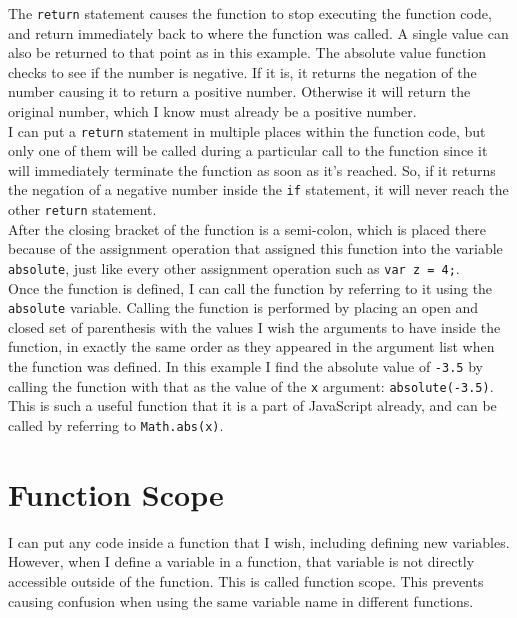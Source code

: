 The \texttt{return} statement causes the function to stop executing the function code, and return immediately back to where the function was called. A single value can also be returned to that point as in this example. The absolute value function checks to see if the number is negative. If it is, it returns the negation of the number causing it to return a positive number. Otherwise it will return the original number, which I know must already be a positive number.\\

I can put a \texttt{return} statement in multiple places within the function code, but only one of them will be called during a particular call to the function since it will immediately terminate the function as soon as it's reached. So, if it returns the negation of a negative number inside the \texttt{if} statement, it will never reach the other \texttt{return} statement.\\

After the closing bracket of the function is a semi-colon, which is placed there because of the assignment operation that assigned this function into the variable \texttt{absolute}, just like every other assignment operation such as \texttt{var z = 4;}.\\

Once the function is defined, I can call the function by referring to it using the \texttt{absolute} variable. Calling the function is performed by placing an open and closed set of parenthesis with the values I wish the arguments to have inside the function, in exactly the same order as they appeared in the argument list when the function was defined. In this example I find the absolute value of \texttt{-3.5} by calling the function with that as the value of the \texttt{x} argument: \texttt{absolute(-3.5)}. This is such a useful function that it is a part of JavaScript already, and can be called by referring to \texttt{Math.abs(x)}.\\

\section{Function Scope}


I can put any code inside a function that I wish, including defining new variables. However, when I define a variable in a function, that variable is not directly accessible outside of the function. This is called function scope. This prevents causing confusion when using the same variable name in different functions.\\

